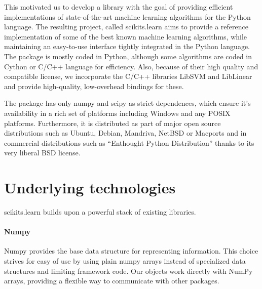 \documentclass[twoside,11pt]{article}
\begin{document}


This motivated us to develop a library with the goal of providing
efficient implementations of state-of-the-art machine learning
algorithms for the Python language. The resulting project, called
scikits.learn aims to provide a reference implementation of some of
the best known machine learning algorithms, while maintaining an
easy-to-use interface tightly integrated in the Python language. The
package is mostly coded in Python, although some algorithms are coded
in Cython or C/C++ language for efficiency. Also, because of their
high quality and compatible license, we incorporate the C/C++
libraries LibSVM and LibLinear and provide high-quality, low-overhead
bindings for these.


The package has only numpy and scipy as strict dependences, which ensure
it's availability in a rich set of platforms including
Windows and any POSIX platforms. Furthermore, it is distributed as part of
major open source distributions such as Ubuntu, Debian, Mandriva, NetBSD
or Macports and in commercial distributions such as ``Enthought Python
Distribution'' thanks to its very liberal BSD license.



\section{Underlying technologies}


scikits.learn builds upon a powerful stack of existing libraries.

\paragraph{Numpy}

Numpy provides the base data structure for representing
information. This choice strives for easy of use by using plain numpy
arrays instead of specialized data structures and limiting framework
code. Our objects work directly with NumPy arrays, providing a
flexible way to communicate with other packages.
\end{document}
